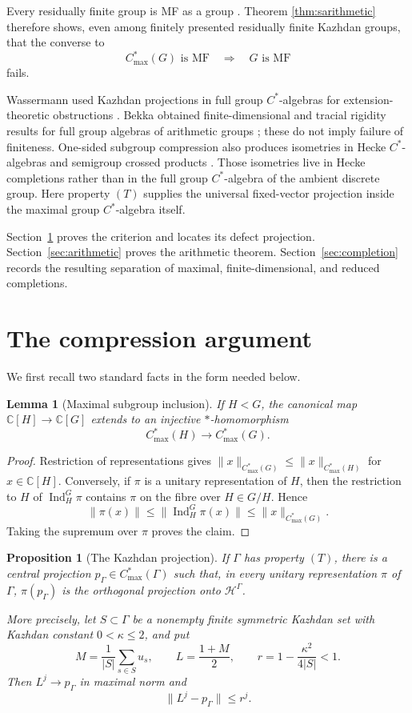 \documentclass[11pt]{article}
\newtheorem{proposition}[theorem]{Proposition}
\newtheorem{lemma}[theorem]{Lemma}
\newcommand{\C}{\mathbb C}
\newcommand{\Hh}{\mathcal H}
\newcommand{\Cmax}[1]{C^*_{\max}(#1)}
\begin{document}
Every residually finite group is MF as a group
\cite[Proposition~2.13]{CarrionDadarlatEckhardt}.  Theorem
\ref{thm:sarithmetic} therefore shows, even among finitely presented
residually finite Kazhdan groups, that the converse to
\[
 \Cmax G\text{ is MF}\quad\Longrightarrow\quad G\text{ is MF}
\]
fails.

Wassermann used Kazhdan projections in full group $C^*$-algebras for
extension-theoretic obstructions \cite{Wassermann}.  Bekka obtained
finite-dimensional and tracial rigidity results for full group algebras of
arithmetic groups \cite{Bekka,BekkaSuper}; these do not imply failure of
finiteness.
One-sided subgroup compression also produces isometries in Hecke
$C^*$-algebras and semigroup crossed products \cite{LacaLarsen}.  Those
isometries live in Hecke completions rather than in the full group $C^*$-algebra
of the ambient discrete group.  Here property $(T)$ supplies the universal
fixed-vector projection inside the maximal group $C^*$-algebra itself.

Section~\ref{sec:compression} proves the criterion and locates its defect
projection.  Section~\ref{sec:arithmetic} proves the arithmetic theorem.
Section~\ref{sec:completion} records the resulting separation of maximal,
finite-dimensional, and reduced completions.

\section{The compression argument}\label{sec:compression}

We first recall two standard facts in the form needed below.

\begin{lemma}[Maximal subgroup inclusion]\label{lem:inclusion}
If $H<G$, the canonical map $\C[H]\to\C[G]$ extends to an injective
$*$-homomorphism
\[
 \Cmax H\longrightarrow\Cmax G.
\]
\end{lemma}

\begin{proof}
Restriction of representations gives $\|x\|_{\Cmax G}\leq
\|x\|_{\Cmax H}$ for $x\in\C[H]$.  Conversely, if $\pi$ is a unitary
representation of $H$, then the restriction to $H$ of
$\operatorname{Ind}_H^G\pi$ contains $\pi$ on the fibre over $H\in G/H$.
Hence
\[
 \|\pi(x)\|\leq\|\operatorname{Ind}_H^G\pi(x)\|
 \leq\|x\|_{\Cmax G}.
\]
Taking the supremum over $\pi$ proves the claim.
\end{proof}

\begin{proposition}[The Kazhdan projection]\label{prop:kazhdan}
If $\Gamma$ has property $(T)$, there is a central projection
$p_\Gamma\in\Cmax\Gamma$ such that, in every unitary representation $\pi$
of $\Gamma$, $\pi(p_\Gamma)$ is the orthogonal projection onto
$\Hh^\Gamma$.

More precisely, let $S\subset\Gamma$ be a nonempty finite symmetric
Kazhdan set with Kazhdan constant $0<\kappa\leq2$, and put
\[
 M=\frac1{|S|}\sum_{s\in S}u_s,
 \qquad
 L=\frac{1+M}{2},
 \qquad
 r=1-\frac{\kappa^2}{4|S|}<1.
\]
Then $L^j\to p_\Gamma$ in maximal norm and
\[
 \|L^j-p_\Gamma\|\leq r^j.
\]
\end{proposition}
\end{document}
